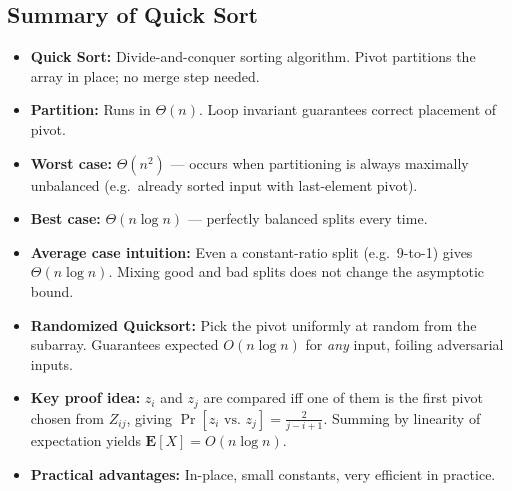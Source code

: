 \subsection{Summary of Quick Sort}

\begin{tcolorbox}[colback=lightblue, colframe=keyblue, fonttitle=\bfseries,
                  title={Key Points}]
\begin{itemize}[noitemsep]
  \item \textbf{Quick Sort:} Divide-and-conquer sorting algorithm. Pivot partitions the array
        in place; no merge step needed.
  \item \textbf{Partition:} Runs in $\Theta(n)$. Loop invariant guarantees correct placement
        of pivot.
  \item \textbf{Worst case:} $\Theta(n^2)$ — occurs when partitioning is always maximally
        unbalanced (e.g.\ already sorted input with last-element pivot).
  \item \textbf{Best case:} $\Theta(n \log n)$ — perfectly balanced splits every time.
  \item \textbf{Average case intuition:} Even a constant-ratio split (e.g.\ 9-to-1) gives
        $\Theta(n \log n)$. Mixing good and bad splits does not change the asymptotic bound.
  \item \textbf{Randomized Quicksort:} Pick the pivot uniformly at random from the subarray.
        Guarantees expected $O(n \log n)$ for \emph{any} input, foiling adversarial inputs.
  \item \textbf{Key proof idea:} $z_i$ and $z_j$ are compared iff one of them is the first
        pivot chosen from $Z_{ij}$, giving $\Pr[z_i \text{ vs.\ } z_j] = \frac{2}{j-i+1}$.
        Summing by linearity of expectation yields $\mathbf{E}[X] = O(n \log n)$.
  \item \textbf{Practical advantages:} In-place, small constants, very efficient in practice.
\end{itemize}
\end{tcolorbox}